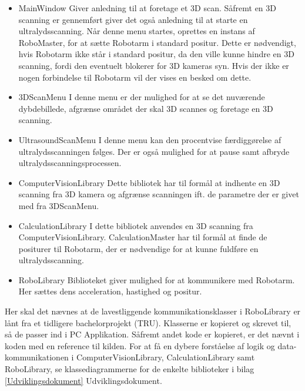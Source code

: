 \let\labelitemi\labelitemii
\begin{itemize}
\item{MainWindow}\newline
Giver anledning til at foretage et 3D scan. Såfremt en 3D scanning er gennemført giver det også anledning til at starte en ultralydsscanning. Når denne menu startes, oprettes en instans af RoboMaster, for at sætte Robotarm i standard positur. Dette er nødvendigt, hvis Robotarm ikke står i standard positur, da den ville kunne hindre en 3D scanning, fordi den eventuelt blokerer for 3D kameras syn.
Hvis der ikke er nogen forbindelse til Robotarm vil der vises en besked om dette.

\item{3DScanMenu}\newline
I denne menu er der mulighed for at se det nuværende dybdebillede, afgrænse området der skal 3D scannes og foretage en 3D scanning.

\item{UltrasoundScanMenu}\newline
I denne menu kan den procentvise færdiggørelse af ultralydsscanningen følges. Der er også mulighed for at pause samt afbryde ultralydsscanningsprocessen.

\item{ComputerVisionLibrary}\newline
Dette bibliotek har til formål at indhente en 3D scanning fra 3D kamera og afgrænse scanningen ift. de parametre der er givet med fra 3DScanMenu.

\item{CalculationLibrary}\newline
I dette bibliotek anvendes en 3D scanning fra ComputerVisionLibrary. CalculationMaster har til formål at finde de positurer til Robotarm, der er nødvendige for at kunne fuldføre en ultralydsscanning.

\item{RoboLibrary}\newline
Biblioteket giver mulighed for at kommunikere med Robotarm. Her sættes dens acceleration, hastighed og positur.
\end{itemize}

Her skal det nævnes at de lavestliggende kommunikationsklasser i RoboLibrary er lånt fra et tidligere bachelorprojekt (TRU). Klasserne er kopieret og skrevet til, så de passer ind i PC Applikation. Såfremt andet kode er kopieret, er det nævnt i koden med en reference til kilden.
For at få en dybere forståelse af logik og data-kommunikationen i ComputerVisionLibrary, CalculationLibrary samt RoboLibrary, se klassediagrammerne for de enkelte biblioteker i bilag \ref{Udviklingsdokument} Udviklingsdokument. 
\newpage

